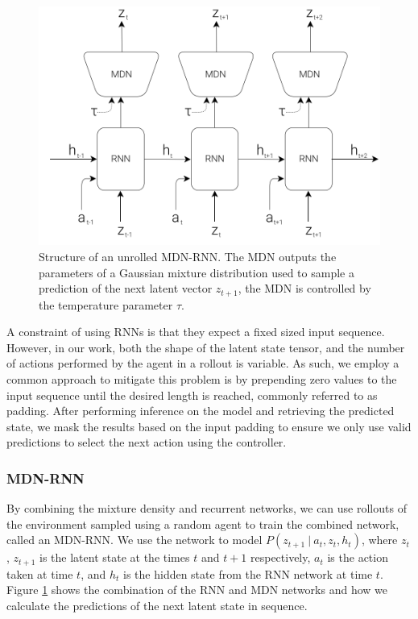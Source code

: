 \begin{figure}[ht]
  \centering
  \includegraphics[width=0.75\columnwidth]{sections/4rlopt/images/mdnrnn.png}
  \caption[Temporally unrolled MDN-RNN]{Structure of an unrolled MDN-RNN. The MDN outputs the parameters of a Gaussian mixture distribution used to sample a prediction of the next latent vector $z_{t+1}$, the MDN is controlled by the temperature parameter $\tau$.}
  \label{fig:rl:mdnrnn}
\end{figure}

A constraint of using RNNs is that they expect a fixed sized input sequence. However, in our work, both the shape of the latent state tensor, and the number of actions performed by the agent in a rollout is variable. As such, we employ a common approach to mitigate this problem is by prepending zero values to the input sequence until the desired length is reached, commonly referred to as padding. After performing inference on the model and retrieving the predicted state, we mask the results based on the input padding to ensure we only use valid predictions to select the next action using the controller.

\subsubsection{MDN-RNN}

By combining the mixture density and recurrent networks, we can use rollouts of the environment sampled using a random agent to train the combined network, called an MDN-RNN. We use the network to model $P(z_{t+1}~|~a_t, z_t, h_t)$, where $z_t$, $z_{t+1}$ is the latent state at the times $t$ and $t+1$ respectively, $a_t$ is the action taken at time $t$, and $h_t$ is the hidden state from the RNN network at time $t$. Figure \ref{fig:rl:mdnrnn} shows the combination of the RNN and MDN networks and how we calculate the predictions of the next latent state in sequence.

